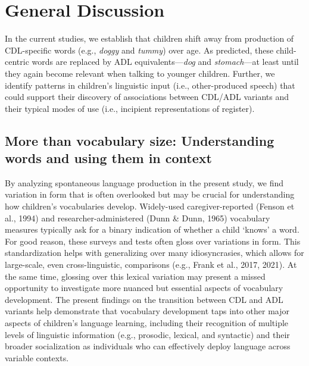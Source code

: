 \documentclass[10pt, letterpaper]{article}
\begin{document}
\hypertarget{general-discussion}{%
\section{General Discussion}\label{general-discussion}}

In the current studies, we establish that children shift away from
production of CDL-specific words (e.g., \emph{doggy} and \emph{tummy})
over age. As predicted, these child-centric words are replaced by ADL
equivalents---\emph{dog} and \emph{stomach}---at least until they again
become relevant when talking to younger children. Further, we identify
patterns in children's linguistic input (i.e., other-produced speech)
that could support their discovery of associations between CDL/ADL
variants and their typical modes of use (i.e., incipient representations
of register).

\hypertarget{more-than-vocabulary-size-understanding-words-and-using-them-in-context}{%
\subsection{More than vocabulary size: Understanding words and using
them in
context}\label{more-than-vocabulary-size-understanding-words-and-using-them-in-context}}

By analyzing spontaneous language production in the present study, we
find variation in form that is often overlooked but may be crucial for
understanding how children's vocabularies develop. Widely-used
caregiver-reported (Fenson et al., 1994) and researcher-administered
(Dunn \& Dunn, 1965) vocabulary measures typically ask for a binary
indication of whether a child `knows' a word. For good reason, these
surveys and tests often gloss over variations in form. This
standardization helps with generalizing over many idiosyncrasies, which
allows for large-scale, even cross-linguistic, comparisons (e.g., Frank
et al., 2017, 2021). At the same time, glossing over this lexical
variation may present a missed opportunity to investigate more nuanced
but essential aspects of vocabulary development. The present findings on
the transition between CDL and ADL variants help demonstrate that
vocabulary development taps into other major aspects of children's
language learning, including their recognition of multiple levels of
linguistic information (e.g., prosodic, lexical, and syntactic) and
their broader socialization as individuals who can effectively deploy
language across variable contexts.
\end{document}
